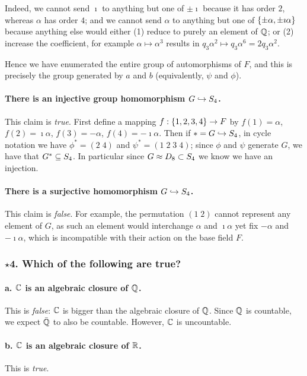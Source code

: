 Indeed, we cannot send $\imath$ to anything but one of $\pm\imath$ because it has order $2$, whereas $\alpha$ has order $4$; and we cannot send $\alpha$ to anything but one of $\left\{\pm\alpha, \pm\imath\alpha\right\}$ because anything else would either (1) reduce to purely an element of $\mathbb{Q}$; or (2) increase the coefficient, for example $\alpha \mapsto \alpha^3$ results in $q_3 \alpha^2 \mapsto q_3 \alpha^6 = 2 q_3 \alpha^2$.

Hence we have enumerated the entire group of automorphisms of $F$, and this is precisely the group generated by $a$ and $b$ (equivalently, $\psi$ and $\phi$).

\paragraph*{There is an injective group homomorphism $G \hookrightarrow S_4$.}
This claim is \emph{true}. First define a mapping $f: \left\{1, 2, 3 ,4\right\} \to F$ by $f(1) = \alpha$, $f(2) = \imath\alpha$, $f(3) = -\alpha$, $f(4) = -\imath\alpha$. Then if $* = G \hookrightarrow S_4$, in cycle notation we have $\phi^* = (2\;4)$ and $\psi^* = (1\;2\;3\;4)$; since $\phi$ and $\psi$ generate $G$, we have that $G^* \subseteq S_4$. In particular since $G \approx D_8 \subset S_4$ we know we have an injection.

\paragraph*{There is a surjective homomorphism $G \hookrightarrow S_4$.}
This claim is \emph{false}. For example, the permutation $(1\;2)$ cannot represent any element of $G$, as such an element would interchange $\alpha$ and $\imath\alpha$ yet fix $-\alpha$ and $-\imath\alpha$, which is incompatible with their action on the base field $F$.

\subsubsection*{$\star$4. Which of the following are true?}
\paragraph*{a. $\mathbb{C}$ is an algebraic closure of $\mathbb{Q}$.}
This is \emph{false}: $\mathbb{C}$ is bigger than the algebraic closure of $\mathbb{Q}$. Since $\mathbb{Q}$ is countable, we expect $\bar{\mathbb{Q}}$ to also be countable. However, $\mathbb{C}$ is uncountable.

\paragraph*{b. $\mathbb{C}$ is an algebraic closure of $\mathbb{R}$.}
This is \emph{true}.

